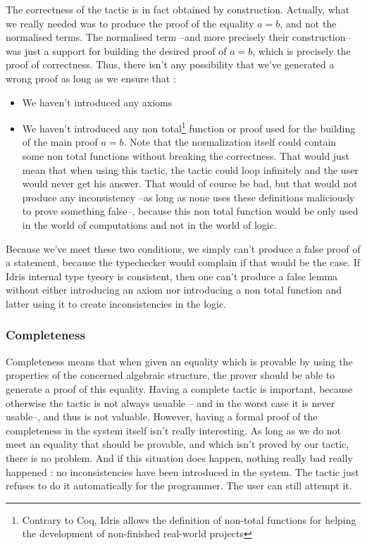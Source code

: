 The correctness of the tactic is in fact obtained by construction. Actually, what we really needed was to produce the proof of the equality $a=b$, and not the normalised terms. The normalised term --and more precisely their construction-- was just a support for building the desired proof of $a=b$, which is precisely the proof of correctness. Thus, there isn't any possibility that we've generated a wrong proof as long as we ensure that :
\begin{itemize}
\item We haven't introduced any axioms
\item We haven't introduced any non total\footnote{Contrary to Coq, Idris allows the definition of non-total functions for helping the development of non-finished real-world projects} function or proof used for the building of the main proof $a=b$. Note that the normalization itself could contain some non total functions without breaking the correctness. That would just mean that when using this tactic, the tactic could loop infinitely and the user would never get his answer. That would of course be bad, but that would not produce any inconsistency --as long as none uses these definitions maliciously to prove something false--, because this non total function would be only used in the world of computations and not in the world of logic.
\end{itemize}

Because we've meet these two conditions, we simply can't produce a false proof of a statement, because the typechecker would complain if that would be the case. If Idris internal type tyeory is consistent, then one can't produce a false lemma without either introducing an axiom nor introducing a non total function and latter using it to create inconsistencies in the logic.

		
		\subsubsection{Completeness}
		
Completeness means that when given an equality which is provable by using the properties of the concerned algebraic structure, the prover should be able to generate a proof of this equality. Having a complete tactic is important, because otherwise the tactic is not always usuable -- and in the worst case it is never usable--, and thus is not valuable. However, having a formal proof of the completeness in the system itself isn't really interesting. As long as we do not meet an equality that should be provable, and which isn't proved by our tactic, there is no problem. And if this situation does happen, nothing really bad really happened : no inconsistencies have been introduced in the system. The tactic just refuses to do it automatically for the programmer. The user can still attempt it. \\

